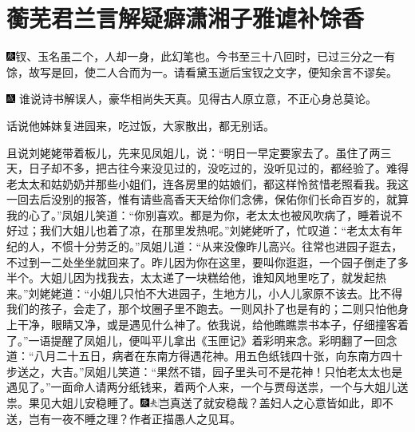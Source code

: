 

\chapter{蘅芜君兰言解疑癖\hspace{.5em}潇湘子雅谑补馀香}

{\includegraphics[width=3mm]{../Images/00004}钗、玉名虽二个，人却一身，此幻笔也。今书至三十八回时，已过三分之一有馀，故写是回，使二人合而为一。请看黛玉逝后宝钗之文字，便知余言不谬矣。}

{\includegraphics[width=3mm]{../Images/00005}  \kaishu 谁说诗书解误人，豪华相尚失天真。见得古人原立意，不正心身总莫论。}

话说他姊妹复进园来，吃过饭，大家散出，都无别话。

且说刘姥姥带着板儿，先来见凤姐儿，说：``明日一早定要家去了。虽住了两三天，日子却不多，把古往今来没见过的，没吃过的，没听见过的，都经验了。难得老太太和姑奶奶并那些小姐们，连各房里的姑娘们，都这样怜贫惜老照看我。我这一回去后没别的报答，惟有请些高香天天给你们念佛，保佑你们长命百岁的，就算我的心了。''凤姐儿笑道：``你别喜欢。都是为你，老太太也被风吹病了，睡着说不好过；我们大姐儿也着了凉，在那里发热呢。''刘姥姥听了，忙叹道：``老太太有年纪的人，不惯十分劳乏的。''凤姐儿道：``从来没像昨儿高兴。往常也进园子逛去，不过到一二处坐坐就回来了。昨儿因为你在这里，要叫你逛逛，一个园子倒走了多半个。大姐儿因为找我去，太太递了一块糕给他，谁知风地里吃了，就发起热来。''刘姥姥道：``小姐儿只怕不大进园子，生地方儿，小人儿家原不该去。比不得我们的孩子，会走了，那个坟圈子里不跑去。一则风扑了也是有的；二则只怕他身上干净，眼睛又净，或是遇见什么神了。依我说，给他瞧瞧祟书本子，仔细撞客着了。''一语提醒了凤姐儿，便叫平儿拿出《玉匣记》着彩明来念。彩明翻了一回念道：``八月二十五日，病者在东南方得遇花神。用五色纸钱四十张，向东南方四十步送之，大吉。''凤姐儿笑道：``果然不错，园子里头可不是花神！只怕老太太也是遇见了。''一面命人请两分纸钱来，着两个人来，一个与贾母送祟，一个与大姐儿送祟。果见大姐儿安稳睡了。{\includegraphics[width=3mm]{../Images/00004}\includegraphics[width=3mm]{../Images/00012}\footnotesize \kaishu 岂真送了就安稳哉？盖妇人之心意皆如此，即不送，岂有一夜不睡之理？作者正描愚人之见耳。}

